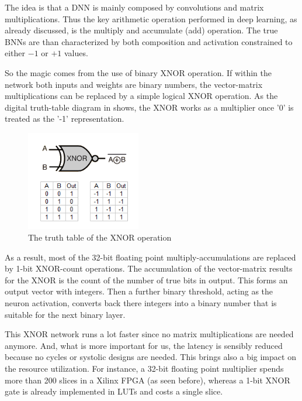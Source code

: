 The idea is that a DNN is mainly composed by convolutions and matrix multiplications. Thus the key arithmetic operation performed in deep learning, as already discussed, is the multiply and accumulate (add) operation. 
The true BNNs are than characterized by both composition and activation constrained to either $-1$ or $+1$ values.

So the magic comes from the use of binary XNOR operation. If within the network both inputs and weights are binary numbers, the vector-matrix multiplications can be replaced by a simple logical XNOR operation.
As the digital truth-table diagram in \Figure{\ref{fig:XNOR}} shows, the XNOR works as a multiplier once '0' is treated as the '-1' representation. 
%
\begin{figure}
    \centering
    \includegraphics[width=5cm]{img/4_EmbeddedML/XNOR_gate.png}
    \caption{The truth table of the XNOR operation}
    \label{fig:XNOR}
\end{figure}
%
As a result, most of the 32-bit floating point multiply-accumulations are replaced by 1-bit XNOR-count operations.
The accumulation of the vector-matrix results for the XNOR is the count of the number of true bits in output. 
This forms an output vector with integers. 
Then a further binary threshold, acting as the neuron activation, converts back there integers into a binary number that is suitable for the next binary layer.

This XNOR network runs a lot faster since no matrix multiplications are needed anymore. 
And, what is more important for us, the latency is sensibly reduced because no cycles or systolic designs are needed.
This brings also a big impact on the resource utilization.
For instance, a 32-bit floating point multiplier spends more than 200 slices in a Xilinx FPGA (as seen before), whereas a 1-bit XNOR gate is already implemented in LUTs and costs a single slice.

